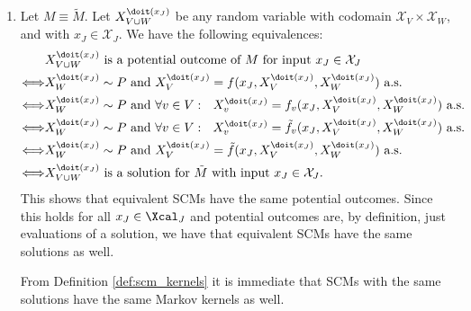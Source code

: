 \begin{enumerate}
\begin{gradedsolution}
\begin{enumerate}
	\item Let $M \equiv \tilde{M}$.
	Let $X_{V\cup W}^{\doit(x_J)}$ be any random variable with codomain $\mathcal{X}_V \times \mathcal{X}_W$, and with $x_J \in \mathcal{X}_J$.
	We have the following equivalences:
	\begin{align*}
		&	X_{V \cup W}^{\doit(x_J)} \text{ is a potential outcome of } M \text{ for input } x_J \in \mathcal{X}_J \\
		\Longleftrightarrow & X_W^{\doit(x_J)} \sim P \text{ and } X_V^{\doit(x_J)} = f(x_J, X_V^{\doit(x_J)}, X_W^{\doit(x_J)}) \text{ a.s. } \\
		\Longleftrightarrow & X_W^{\doit(x_J)} \sim P \text{ and } \forall v \in V: \ \ X_v^{\doit(x_J)} = f_v(x_J, X_V^{\doit(x_J)}, X_W^{\doit(x_J)}) \text{ a.s. } \\
		\Longleftrightarrow & X_W^{\doit(x_J)} \sim P \text{ and } \forall v \in V: \ \ X_v^{\doit(x_J)} = \tilde{f}_v(x_J, X_V^{\doit(x_J)}, X_W^{\doit(x_J)}) \text{ a.s. } \\
		\Longleftrightarrow & X_W^{\doit(x_J)} \sim P \text{ and } X_V^{\doit(x_J)} = \tilde{f}(x_J, X_V^{\doit(x_J)}, X_W^{\doit(x_J)}) \text{ a.s. } \\
		\Longleftrightarrow  &	X_{V \cup W}^{\doit(x_J)} \text{ is a solution for } \tilde{M} \text{ with input } x_J \in \mathcal{X}_J. 
	\end{align*}
	This shows that equivalent SCMs have the same potential outcomes. Since this holds for all $x_J \in \Xcal_J$ and potential outcomes are, by definition, just evaluations of a solution, we have that equivalent SCMs have the same solutions as well.

	From Definition \ref*{def:scm_kernels} it is immediate that SCMs with the same solutions have the same Markov kernels as well.
\end{enumerate}
\end{gradedsolution}


\end{enumerate}
